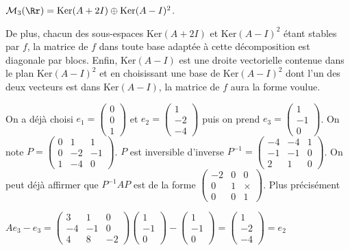 {\begin{enumerate}
{\begin{center}
$\mathcal{M}_3(\Rr)=\text{Ker}(A+2I)\oplus\text{Ker}(A-I)^2$.
\end{center}

De plus,  chacun des sous-espaces $\text{Ker}(A+2I)$ et $\text{Ker}(A-I)^2$ étant stables par $f$, la matrice de $f$ dans toute base adaptée à cette décomposition est diagonale par blocs. Enfin, $\text{Ker}(A-I)$ est une droite vectorielle contenue dans le plan $\text{Ker}(A-I)^2$ et en choisissant une base de $\text{Ker}(A-I)^2$ dont l'un des deux vecteurs est dans $\text{Ker}(A-I)$, la matrice de $f$ aura la forme voulue.

On a déjà choisi $e_1=\left(
\begin{array}{c}
0\\
0\\
1
\end{array}
\right)$ et $e_2=\left(
\begin{array}{c}
1\\
-2\\
-4
\end{array}
\right)$ puis on prend $e_3=\left(
\begin{array}{c}
1\\
-1\\
0
\end{array}
\right)$. On note $P=\left(
\begin{array}{ccc}
0&1&1\\
0&-2&-1\\
1&-4&0
\end{array}
\right)$. $P$ est inversible d'inverse $P^{-1}=\left(
\begin{array}{ccc}
-4&-4&1\\
-1&-1&0\\
2&1&0
\end{array}
\right)$. On peut déjà affirmer que $P^{-1}AP$ est de la forme $\left(
\begin{array}{ccc}
-2&0&0\\
0&1&\times\\
0&0&1
\end{array}
\right)$.
Plus précisément 

\begin{center}
$Ae_3-e_3=\left(
\begin{array}{ccc}
3&1&0\\
-4&-1&0\\
4&8&-2
\end{array}
\right)\left(
\begin{array}{c}
1\\
-1\\
0
\end{array}
\right)-\left(
\begin{array}{c}
1\\
-1\\
0
\end{array}
\right)=\left(
\begin{array}{c}
1\\
-2\\
-4
\end{array}
\right)=e_2$
\end{center}

}
\end{enumerate}}
